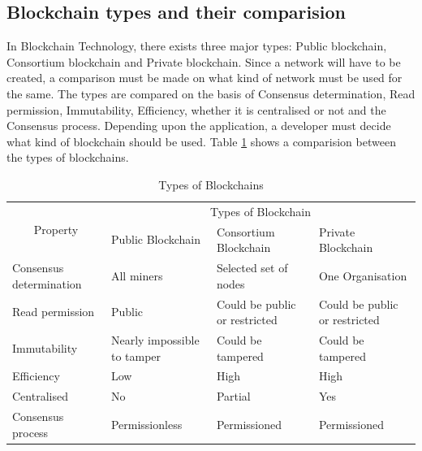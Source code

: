 \documentclass{IEEEtran}
\begin{document}
    \subsection{Blockchain types and their comparision \cite{8029379}}
      In Blockchain Technology, there exists three major types: Public blockchain, Consortium blockchain and Private blockchain. Since a network will have to be created, a comparison must be made on what kind of network must be used for the same. The types are compared on the basis of Consensus determination, Read permission, Immutability, Efficiency, whether it is centralised or not and the Consensus process. Depending upon the application, a developer must decide what kind of blockchain should be used. Table \ref{tab:tab2} shows a comparision between the types of blockchains.
      \begin{table}
        \caption{Types of Blockchains}
        \label{tab:tab2}
        \center
        \begin{tabular}{|l|lll|}
          \hline
          \multicolumn{1}{|c|}{\multirow{2}{*}{Property}} & \multicolumn{3}{c|}{Types of Blockchain}                                                                                              \\ \cline{2-4} 
          \multicolumn{1}{|c|}{}                          & \multicolumn{1}{l|}{Public Blockchain}           & \multicolumn{1}{l|}{Consortium Blockchain}         & Private Blockchain            \\ \hline
          Consensus determination                         & \multicolumn{1}{l|}{All miners}                  & \multicolumn{1}{l|}{Selected set of nodes}         & One Organisation              \\ \hline
          Read permission                                 & \multicolumn{1}{l|}{Public}                      & \multicolumn{1}{l|}{Could be public or restricted} & Could be public or restricted \\ \hline
          Immutability                                    & \multicolumn{1}{l|}{Nearly impossible to tamper} & \multicolumn{1}{l|}{Could be tampered}             & Could be tampered             \\ \hline
          Efficiency                                      & \multicolumn{1}{l|}{Low}                         & \multicolumn{1}{l|}{High}                          & High                          \\ \hline
          Centralised                                     & \multicolumn{1}{l|}{No}                          & \multicolumn{1}{l|}{Partial}                       & Yes                           \\ \hline
          Consensus process                               & \multicolumn{1}{l|}{Permissionless}              & \multicolumn{1}{l|}{Permissioned}                  & Permissioned                  \\ \hline
        \end{tabular}
      \end{table}
\end{document}
